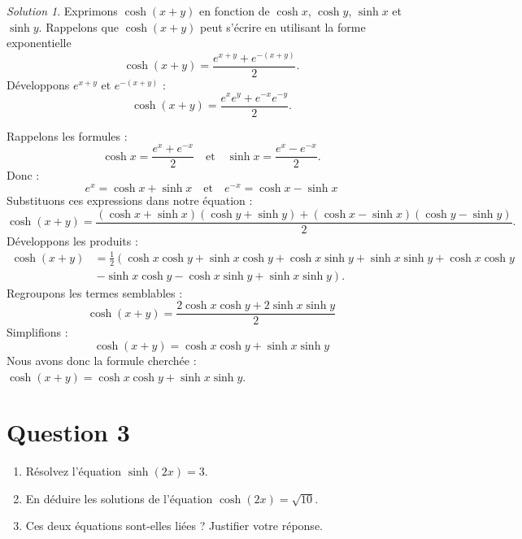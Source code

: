 \documentclass[
  12pt,
  letterpaper,
]{book}
\theoremstyle{remark}
\newtheorem*{solution}{Solution}
\begin{document}
\begin{solution}

Exprimons \(\cosh(x+y)\) en fonction de \(\cosh x\), \(\cosh y\),
\(\sinh x\) et \(\sinh y\). Rappelons que \(\cosh(x+y)\) peut s'écrire
en utilisant la forme exponentielle
\[\cosh(x+y) = \frac{e^{x+y} + e^{-(x+y)}}{2}.\] Développons \(e^{x+y}\)
et \(e^{-(x+y)}\) : \[\cosh(x+y) = \frac{e^x e^y + e^{-x} e^{-y}}{2}.\]

Rappelons les formules :
\[\cosh x = \frac{e^x + e^{-x}}{2} \quad \text{et} \quad \sinh x = \frac{e^x - e^{-x}}{2}.\]
Donc :
\[e^x = \cosh x + \sinh x \quad \text{et} \quad e^{-x} = \cosh x - \sinh x\]
Substituons ces expressions dans notre équation :
\[\cosh(x+y) = \frac{(\cosh x + \sinh x)(\cosh y + \sinh y) + (\cosh x - \sinh x)(\cosh y - \sinh y)}{2}.\]
Développons les produits : \begin{align}
\cosh(x+y) &= \frac{1}{2}\left(\cosh x \cosh y + \sinh x \cosh y + \cosh x \sinh y + \sinh x \sinh y + \cosh x \cosh y\right.\\
&~\left.- \sinh x \cosh y - \cosh x \sinh y + \sinh x \sinh y\right).
\end{align} Regroupons les termes semblables :
\[\cosh(x+y) = \frac{2\cosh x \cosh y + 2\sinh x \sinh y}{2}\]
Simplifions : \[\cosh(x+y) = \cosh x \cosh y + \sinh x \sinh y\] Nous
avons donc la formule cherchée :
\(\cosh(x+y) = \cosh x \cosh y + \sinh x \sinh y\).

\end{solution}

\hypertarget{question-3-3}{%
\section{Question 3}\label{question-3-3}}

\begin{enumerate}
\item
  Résolvez l'équation \(\sinh(2x) = 3\).
\item
  En déduire les solutions de l'équation \(\cosh(2x) = \sqrt{10}\).
\item
  Ces deux équations sont-elles liées ? Justifier votre réponse.
\end{enumerate}
\end{document}
